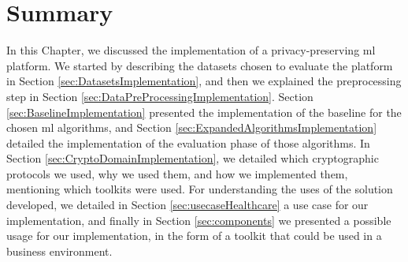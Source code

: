 






  
\section{Summary}
\label{sec:SummaryImplementation}


In this Chapter, we discussed the implementation of a privacy-preserving \ac{ml} platform. We started by describing the datasets chosen to evaluate the platform in Section \ref{sec:DatasetsImplementation}, and then we explained the preprocessing step in Section \ref{sec:DataPreProcessingImplementation}.
Section \ref{sec:BaselineImplementation} presented the implementation of the baseline for the chosen \ac{ml} algorithms, and Section \ref{sec:ExpandedAlgorithmsImplementation} detailed the implementation of the evaluation phase of those algorithms.
In Section \ref{sec:CryptoDomainImplementation}, we detailed which cryptographic protocols we used, why we used them, and how we implemented them, mentioning which toolkits were used.
For understanding the uses of the solution developed, we detailed in Section \ref{sec:usecaseHealthcare} a use case for our implementation, and finally in Section \ref{sec:components} we presented a possible usage for our implementation, in the form of a toolkit that could be used in a business environment.


